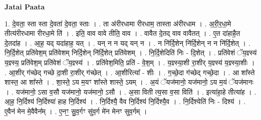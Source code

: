 \documentclass[17pt]{extarticle}
\begin{document}
\textbf{Jatai Paata} \newline

1. दे॒वता॒ स्ता स्ता दे॒वता॑ दे॒वता॒ स्ताः । . ता अ॑रीरधामा रीरधाम॒ तास्ता अ॑रीरधाम । . अ॒री॒र॒धा॒मे तीत्य॑रीरधामा रीरधा॒मे ति॑ । . इति॒ वाव वावे तीति॒ वाव । . वावैत दे॒तद् वाव वावैतत् । . ए॒त दा॑हाहै॒त दे॒तदा॑ह । . आ॒ह॒ यद् यदा॑हाह॒ यत् । . यन् न न यद् यन् न । . न नि॑र्दि॒शेन् नि॑र्दि॒शेन् न न नि॑र्दि॒शेत् । . नि॒र्दि॒शेत् प्रति॑वेश॒म् प्रति॑वेशम् निर्दि॒शेन् नि॑र्दि॒शेत् प्रति॑वेशम् । . नि॒र्दि॒शेदिति॑ निः - दि॒शेत् । . प्रति॑वेशं ॅय॒ज्ञ्स्य॑ य॒ज्ञ्स्य॒ प्रति॑वेश॒म् प्रति॑वेशं ॅय॒ज्ञ्स्य॑ । . प्रति॑वेश॒मिति॒ प्रति॑ - वे॒श॒म् । . य॒ज्ञ्स्या॒शी रा॒शीर् य॒ज्ञ्स्य॑ य॒ज्ञ्स्या॒शीः । . आ॒शीर् ग॑च्छेद् गच्छे दा॒शी रा॒शीर् ग॑च्छेत् । . आ॒शीरित्या᳚ - शीः । . ग॒च्छे॒दा ग॑च्छेद् गच्छे॒दा । . आ शा᳚स्ते शास्त॒ आ शा᳚स्ते । . शा॒स्ते॒ ऽय म॒यꣳ शा᳚स्ते शास्ते॒ ऽयम् । . अ॒यं ॅयज॑मानो॒ यज॑मानो॒ ऽय म॒यं ॅयज॑मानः । . यज॑मानो॒ ऽसा व॒सौ यज॑मानो॒ यज॑मानो॒ ऽसौ । . अ॒सा विती त्य॒सा व॒सा विति॑ । . इत्या॑हा॒हे तीत्या॑ह । . आ॒ह॒ नि॒र्दिश्य॑ नि॒र्दिश्या॑ हाह नि॒र्दिश्य॑ । . नि॒र्दिश्यै॒ वैव नि॒र्दिश्य॑ नि॒र्दिश्यै॒व । . नि॒र्दिश्येति॑ निः - दिश्य॑ । . ए॒वैन॑ मेन मे॒वैवैन᳚म् । . ए॒नꣳ॒॒ सु॒व॒र्गꣳ सु॑व॒र्ग मे॑न मेनꣳ सुव॒र्गम् । \newline
\end{document}
